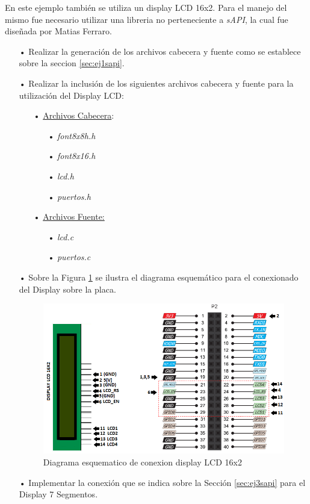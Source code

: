 \documentclass[12pt,letterpaper]{article}
\begin{document}
En este ejemplo también se utiliza un display LCD 16x2. Para el manejo del mismo fue necesario utilizar una libreria no perteneciente a \textit{sAPI}, la cual fue diseñada por Matias Ferraro\cite{repositoriomatiasferraro}.
\begin{enumerate}
\item[•]Realizar la generación de los archivos cabecera y fuente como se establece sobre la seccion \ref{sec:ej1sapi}.
\item[•]Realizar la inclusión de los siguientes archivos cabecera y fuente para la utilización del Display LCD:
\begin{enumerate}
\item[•]\underline{Archivos Cabecera}:
\begin{enumerate}
\item[•]\textit{font8x8h.h}
\item[•]\textit{font8x16.h}
\item[•]\textit{lcd.h}
\item[•]\textit{puertos.h}
\end{enumerate}
\item[•]\underline{Archivos Fuente:}
\begin{enumerate}
\item[•]\textit{lcd.c}
\item[•]\textit{puertos.c}
\end{enumerate}
\end{enumerate}
\item[•]Sobre la Figura \ref{Fig31} se ilustra el diagrama esquemático para el conexionado del Display sobre la placa.

\begin{center}
\begin{figure}[!h]
\centering
\includegraphics[width=8 cm]{figuras/f13.png}
\caption{Diagrama esquematico de conexion display LCD 16x2}
\label{Fig31}
\end{figure}
\end{center}

\item[•]Implementar la conexión que se indica sobre la Sección \ref{sec:ej3sapi} para el Display 7 Segmentos.

\end{enumerate}
\end{document}
